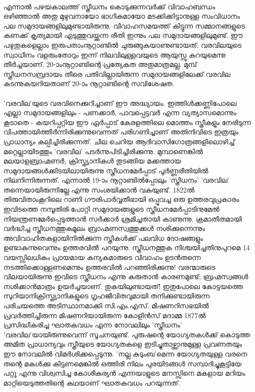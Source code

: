 \paragraph{}എന്നാൽ പഴയകാലത്ത് സ്ത്രീധനം കൊടുക്കുന്നവർക്ക് വിവാഹബന്ധം ഒഴിഞ്ഞാൽ അതു മുഴുവനായോ ഭാഗികമായോ മടക്കിക്കിട്ടാനുള്ള സംവിധാനം പല സമുദായങ്ങളിലുമുണ്ടായിരുന്നു. വിവാഹസമയത്ത് കിട്ടുന്ന സമ്മാനങ്ങളുടെ കണക്ക് കൃത്യമായി എടുത്തുവയ്ക്കുന്ന രീതി ഇന്നും പല സമുദായങ്ങളിലുമുണ്ട്. ഈ പഴുതുകളെല്ലാം ഇരുപതാംനൂറ്റാണ്ടിൽ ചുരുങ്ങുകയാണുണ്ടായത്. വരവിലയുടെ സ്വാധീനം വളരുംതോറും ഇന്ന് നിലവിലുള്ളവയുടെ ആയുസ്സു കുറയുമെന്നു തീർച്ചയാണ്. 20-ാംനൂറ്റാണ്ടിന്റെ പ്രത്യേകത അതുമാത്രമല്ല. മുമ്പ് സ്ത്രീധനസമ്പ്രദായം തീരെ പതിവില്ലായിരുന്ന സമുദായങ്ങളിലേക്ക് വരവില കടന്നുകയറിയതാണ് 20-ാം നൂറ്റാണ്ടിന്റെ സവിശേഷത.



\paragraph{}'വരവില'യുടെ വരവിനെക്കുറിച്ചാണ് ഈ അദ്ധ്യായം. ഇത്തിൾക്കണ്ണിപോലെ എല്ലാ സമുദായങ്ങളിലും - പണക്കാർ, പാവപ്പെട്ടവർ എന്ന വ്യത്യാസമൊന്നും കൂടാതെ - കയറിപ്പറ്റിയ ഈ ഏർപ്പാട് കേരളത്തിലെ മൊത്തം സ്ത്രീകളും നേരിടുന്ന വിപത്തായിത്തീർന്നിരിക്കുന്നുവെന്നത് പരിഗണിച്ചാണ് അതിനിവിടെ ഇത്രയും പ്രാധാന്യം കല്പിച്ചിരിക്കുന്നത്. ചില ചെറിയ ആദിവാസിഗോത്രങ്ങളിലൊഴിച്ച് മറ്റെല്ലായിടത്തും 'വരവില' പടർന്നുപിടിച്ചിരിക്കുന്നു. മുമ്പാണെങ്കിൽ മലയാളബ്രാഹ്മണർ, ക്രിസ്ത്യാനികൾ തുടങ്ങിയ മക്കത്തായ സമുദായങ്ങൾക്കിടയിലായിരുന്നു സ്ത്രീധനമേർപ്പാട് പൂർണ്ണരീതിയിൽ നിലനിന്നിരുന്നത്. എന്നാൽ 19-ാം നൂറ്റാണ്ടിൽപ്പോലും 'സ്ത്രീധനം' 'വരവില' തന്നെയായിരുന്നില്ലേ എന്നു സംശയിക്കാൻ വകയുണ്ട്. 1822ൽ തിരുവിതാംകൂറിലെ റാണി ഗൗരിപാർവ്വതീഭായി ഒപ്പുവച്ച ഒരു ഉത്തരവുപ്രകാരം ഇവിടത്തെ നമ്പൂതിരി-പോറ്റി സമുദായങ്ങളുടെ സ്ത്രീധനമേർപ്പാടിനുമേൽ നിയന്ത്രണമേർപ്പെടുത്താൻ സർക്കാർ ശ്രമിച്ചതായി കാണുന്നു. ക്രമാതീതമായി വർദ്ധിച്ച സ്ത്രീധനത്തുകമൂലം ബ്രാഹ്മണസ്വത്തുക്കൾ നശിക്കുന്നെന്നും അവിവാഹിതകളായിനിൽക്കുന്ന സ്ത്രീകൾക്ക് പലവിധ ദോഷങ്ങളും ഉണ്ടാകുന്നുവെന്നും ഉത്തരവിൽ പറയുന്നു. സ്ത്രീധനത്തുക നിശ്ചയിച്ചതിനുപുറമെ 14 വയസ്സിലധികം പ്രായമായ കന്യകമാരുടെ വിവാഹം ഉടൻതന്നെ നടത്തിക്കൊള്ളണമെന്നും ഉത്തരവിൽ പറഞ്ഞിരിക്കുന്നു! വരന്മാരുടെ വിലയായിരുന്നു ഇവിടെ സ്ത്രീധനം എന്നു കരുതാൻ കാരണമുണ്ട്; ബ്രഹ്മസ്വങ്ങൾ നശിക്കാൻമാത്രം ഉയർച്ചയാണ്. തുകയിലുണ്ടായത്! ഇതുപോലെ കോട്ടയത്തെ സുറിയാനിക്രിസ്ത്യാനികളുടെ ഗൃഹജീവിതവുമായി തനിക്കുണ്ടായിരുന്ന പരിചയത്തെ അടിസ്ഥാനമാക്കി സി.എം.എസ്. മിഷണറിസഭയിൽ പ്രവർത്തിച്ചിരുന്ന മിഷണറിയായിരുന്ന കോളിൻസ് മദാമ്മ 1877ൽ പ്രസിദ്ധീകരിച്ച ഘാതകവധം എന്ന നോവലിലും 'സ്ത്രീധനം' 'വരവില'യായിരുന്നുവെന്ന് സൂചനയുണ്ട്. പുരുഷന്റെ യോഗ്യതകൾക്ക് കൊടുത്ത അമിത പ്രാധാന്യവും സ്ത്രീയുടെ യോഗ്യതകളെ ഇടിച്ചുതാഴ്ത്താനുമുള്ള പ്രവണതയും ഈ നോവലിൽ വിമർശിക്കപ്പെടുന്നു. 'നല്ല കുടുംബ'മെന്ന യോഗ്യതയുള്ള വരനെ തന്റെ മകൾക്കു കിട്ടണമെങ്കിൽ ഒത്തിരി നിലം പുരയിടങ്ങൾ സമ്പാദിച്ചുകൂട്ടിയേ പറ്റൂ എന്നു വിശ്വസിച്ച കോശീകുര്യൻ എന്നയാളുടെ മനസ്സിനെ മകളായ മറിയം മാറ്റിയെടുത്തതിന്റെ കഥയാണ് ഘാതകവധം പറയുന്നത്.


